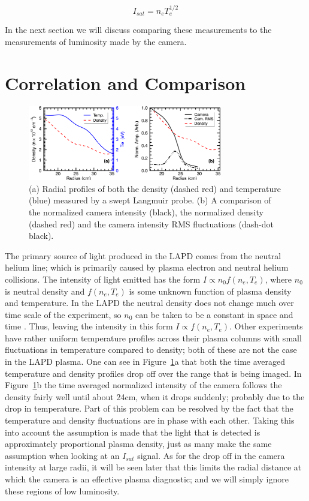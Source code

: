 \documentclass{jpp}
\begin{document}
\begin{equation} I_{sat}=n_e T_e^{1/2}
\label{eq:one}
\end{equation}

In the next section we will discuss comparing these measurements to the measurements of luminosity made by the camera.


\section{Correlation and Comparison}


\begin{figure}
\centerline{\includegraphics[width=8.5cm]{plot_dens_lum_temp_4_0V}}
\caption{  (a) Radial profiles of both the density (dashed red) and temperature (blue) measured by a swept Langmuir probe.  (b) A comparison of the normalized camera intensity (black), the normalized density (dashed red)  and the camera intensity RMS fluctuations (dash-dot black). }
\label{fig:plot_dens_lum_temp_4_0V}
\end{figure}

The primary source of light produced in the LAPD comes from the neutral helium line; which is primarily caused by plasma electron and neutral helium collisions. The intensity of light emitted has the form $I \propto n_0f(n_e, T_e)$, where $n_0$ is neutral density and $f(n_e, T_e)$ is some unknown function of plasma density and temperature. In the LAPD the neutral density does not change much over time scale of the experiment, so $n_0$ can be taken to be a constant in space and time \citep{maggs07}. Thus, leaving the intensity in this form $I \propto f(n_e, T_e)$.  Other experiments \citep{antar07, light13} have rather uniform temperature profiles across their plasma columns with small fluctuations in temperature compared to density; both of these are not the case in the LAPD plasma. One can see in Figure~\ref{fig:plot_dens_lum_temp_4_0V}a that both the time averaged temperature and density profiles drop off over the range that is being imaged.  In Figure~\ref{fig:plot_dens_lum_temp_4_0V}b the time averaged normalized intensity of the camera follows the density fairly well until about 24cm, when it drops suddenly; probably due to the drop in temperature.  Part of this problem can be resolved by the fact that the temperature and density fluctuations are in phase with each other. Taking this into account the assumption is made that the light that is detected is approximately proportional plasma density, just as many make the same assumption when looking at an $I_{sat}$ signal. As for the drop off in the camera intensity at large radii, it will be seen later that this limits the radial distance at which the camera is an effective plasma diagnostic; and we will simply ignore these regions of low luminosity.
\end{document}
